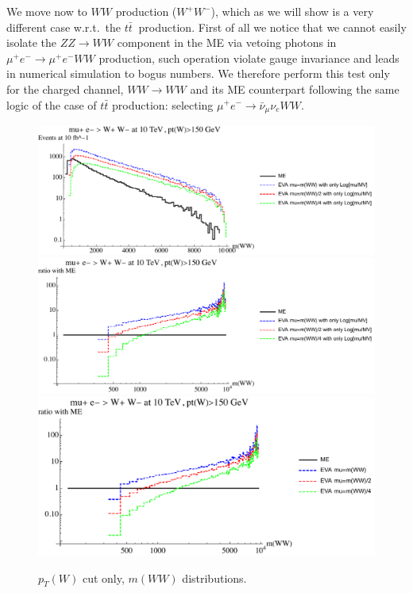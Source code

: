 \documentclass[a4paper,11pt]{article}
\begin{document}
We move now to $WW$ production ($W^+W^-$), which as we will show is a very different case w.r.t.~the $t \bar t~$ production.
First of all we notice that we cannot easily isolate the $ZZ\to WW$ component in the ME via vetoing photons in $\mu^+e^-\to\mu^+e^- WW$ production, such operation violate gauge invariance and leads in numerical simulation to bogus numbers. We therefore perform this test only for the charged channel, $WW\to WW$ and its ME counterpart following the same logic of the case of $t \bar t$ production: selecting $\mu^+e^-\to\bar \nu_\mu \nu_e WW$.


\begin{figure}[!t]
\includegraphics[width=0.46\linewidth]{Notebooks/PlotDistr/WW_WW/10TeVolnlyptcut/plotmWW.pdf}
\includegraphics[width=0.46\linewidth]{Notebooks/PlotDistr/WW_WW/10TeVolnlyptcut/plotmWWratio1.pdf}
\includegraphics[width=0.46\linewidth]{Notebooks/PlotDistr/WW_WW/10TeVolnlyptcut/plotmWWratio2.pdf}
\caption{$p_T(W)$ cut only, $m(WW)$ distributions. \label{fig:ptcutWWWW}}

\end{figure}
\end{document}

